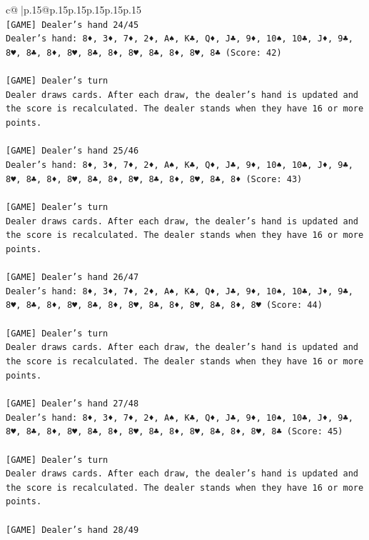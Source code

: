 \documentclass{article}
\begin{document}
{\begin{supertabular}{c@{$\;$}|p{.15\linewidth}@{}p{.15\linewidth}p{.15\linewidth}p{.15\linewidth}p{.15\linewidth}p{.15\linewidth}}
{{{\\ 
\texttt{{[}GAME{]} Dealer's hand 24/45} \\
\texttt{Dealer's hand: 8♦, 3♦, 7♦, 2♦, A♠, K♣, Q♦, J♣, 9♦, 10♠, 10♣, J♦, 9♣, 8♥, 8♣, 8♦, 8♥, 8♣, 8♦, 8♥, 8♣, 8♦, 8♥, 8♣ (Score: 42)} \\
\\ 
\texttt{{[}GAME{]} Dealer's turn} \\
\texttt{Dealer draws cards. After each draw, the dealer's hand is updated and the score is recalculated. The dealer stands when they have 16 or more points.} \\
\\ 
\texttt{{[}GAME{]} Dealer's hand 25/46} \\
\texttt{Dealer's hand: 8♦, 3♦, 7♦, 2♦, A♠, K♣, Q♦, J♣, 9♦, 10♠, 10♣, J♦, 9♣, 8♥, 8♣, 8♦, 8♥, 8♣, 8♦, 8♥, 8♣, 8♦, 8♥, 8♣, 8♦ (Score: 43)} \\
\\ 
\texttt{{[}GAME{]} Dealer's turn} \\
\texttt{Dealer draws cards. After each draw, the dealer's hand is updated and the score is recalculated. The dealer stands when they have 16 or more points.} \\
\\ 
\texttt{{[}GAME{]} Dealer's hand 26/47} \\
\texttt{Dealer's hand: 8♦, 3♦, 7♦, 2♦, A♠, K♣, Q♦, J♣, 9♦, 10♠, 10♣, J♦, 9♣, 8♥, 8♣, 8♦, 8♥, 8♣, 8♦, 8♥, 8♣, 8♦, 8♥, 8♣, 8♦, 8♥ (Score: 44)} \\
\\ 
\texttt{{[}GAME{]} Dealer's turn} \\
\texttt{Dealer draws cards. After each draw, the dealer's hand is updated and the score is recalculated. The dealer stands when they have 16 or more points.} \\
\\ 
\texttt{{[}GAME{]} Dealer's hand 27/48} \\
\texttt{Dealer's hand: 8♦, 3♦, 7♦, 2♦, A♠, K♣, Q♦, J♣, 9♦, 10♠, 10♣, J♦, 9♣, 8♥, 8♣, 8♦, 8♥, 8♣, 8♦, 8♥, 8♣, 8♦, 8♥, 8♣, 8♦, 8♥, 8♣ (Score: 45)} \\
\\ 
\texttt{{[}GAME{]} Dealer's turn} \\
\texttt{Dealer draws cards. After each draw, the dealer's hand is updated and the score is recalculated. The dealer stands when they have 16 or more points.} \\
\\ 
\texttt{{[}GAME{]} Dealer's hand 28/49} \\
}}}
\end{supertabular}}
\end{document}
